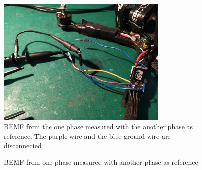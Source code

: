 \documentclass[]{report}
\begin{document}
\begin{figure}[H]
	\centering
	\includegraphics[width=0.75\textwidth]{Scope/EmaxEco2306_threePhases/FreeWheelSinglePhase_PhaseRef/ESC_OtherPhaseReferenceFreewheel_Setup.jpg}
	\caption{BEMF from the one phase measured with the another phase as reference. The purple wire and the blue ground wire are disconnected}
	\label{fig:BLDC_BEMF_Phase_Ref_Setup}
\end{figure} 

\begin{figure}[H]
	\centering
	\hfill
	\caption{BEMF from one phase measured with another phase as reference}
	\label{fig:BLDC_BEMF_Phase_Ref}
\end{figure}
\end{document}
